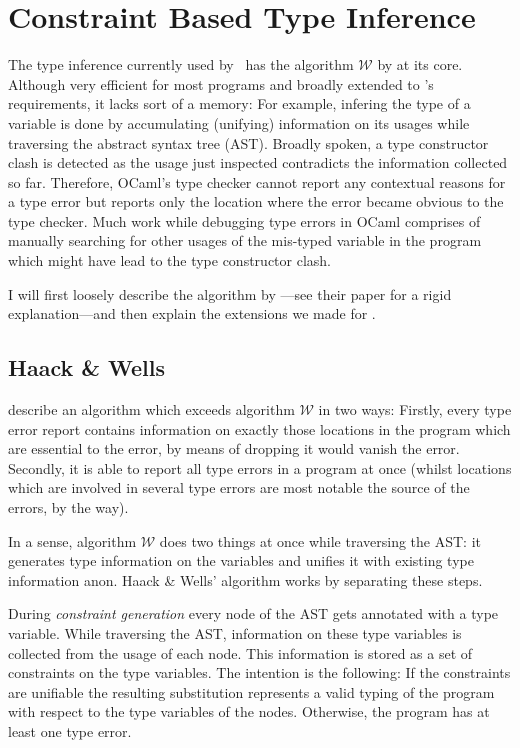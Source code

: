 
\section{Constraint Based Type Inference}
\label{sec:typeinfer}

The type inference currently used by \ocaml\ has the algorithm $\mathcal W$ by
\citet{milner78} at its core.
Although very efficient for most programs and broadly extended to \ocaml's 
requirements, it lacks sort of a memory:  For example, infering the type of a
variable is done by accumulating (unifying) information on its usages while
traversing the abstract syntax tree (AST).
Broadly spoken, a type constructor clash is detected as the usage just
inspected contradicts the information collected so far.
Therefore, OCaml's type checker cannot report any contextual reasons for a type
error but reports only the location where the error became obvious to the type
checker.
Much work while debugging type errors in OCaml comprises of manually searching
for other usages of the mis-typed variable in the program which might have lead
to the type constructor clash.

I will first loosely describe the algorithm by \citeauthor{haackwells04}---see
their \citeyear{haackwells04} paper for a rigid explanation---and then explain
the extensions we made for \easyocaml.


\subsection{Haack \& Wells}

\citet{haackwells04} describe an algorithm which exceeds algorithm $\mathcal W$
in two ways:
Firstly, every type error report contains information on exactly those
locations in the program which are essential to the error, by means of dropping
it would vanish the error.
Secondly, it is able to report all type errors in a program at once (whilst
locations which are involved in several type errors are most notable the source
of the errors, by the way).

In a sense, algorithm $\mathcal W$ does two things at once while traversing the 
AST: it generates type information on the variables and unifies it with 
existing type information anon.  Haack \& Wells' algorithm works by separating
these steps.

During \emph{constraint generation} every node of the AST gets 
annotated with a type variable. While traversing the AST, information on 
these type variables is collected from the usage of each node.  This
information is stored as a set of constraints on the type variables.
The intention is the following: If the constraints are unifiable the resulting
substitution represents a valid typing of the program with respect to the type
variables of the nodes.
Otherwise, the program has at least one type error.

